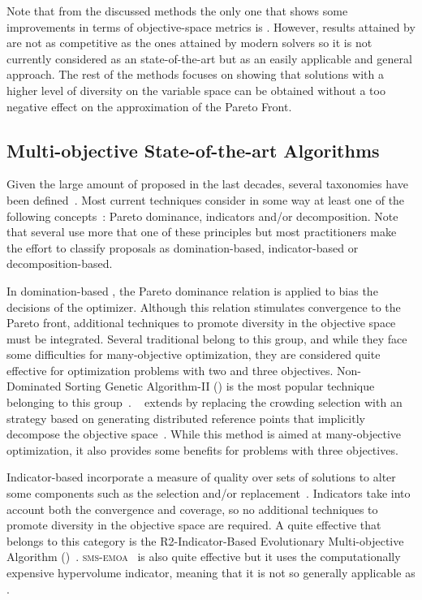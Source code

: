 Note that from the discussed methods the only one that shows some improvements in terms of objective-space metrics is \GDEA{}.
%
However, results attained by \GDEA{} are not as competitive as the ones attained by modern solvers so it is not currently
considered as an state-of-the-art \MOEA{} but as an easily applicable and general approach.
%
The rest of the methods focuses on showing that solutions with a higher level of diversity on the variable space
can be obtained without a too negative effect
on the approximation of the Pareto Front.


\subsection{Multi-objective State-of-the-art Algorithms}

Given the large amount of \MOEAS{} proposed in the last decades, several taxonomies have been defined~\cite{bechikh2016recent}.
%
Most current techniques consider in some way at least one of the following concepts~\cite{trivedi2016survey}:
Pareto dominance, indicators and/or decomposition.
%
Note that several \MOEAS{} use more that one of these principles but most practitioners make the effort to classify
proposals as domination-based, indicator-based or decomposition-based.

In domination-based \MOEAS{}, the Pareto dominance relation is applied to bias the decisions of the optimizer.
%
Although this relation stimulates convergence to the Pareto front, additional techniques to promote
diversity in the objective space must be integrated.
%
Several traditional \MOEAS{} belong to this group, and while they face some difficulties for many-objective
optimization, they are considered quite effective for optimization problems with two and three objectives.
%
Non-Dominated Sorting Genetic Algorithm-II (\NSGAII{}) is the most popular technique belonging to this group~\cite{deb2002fast}.
%
\NSGAIII{}~\cite{deb2013evolutionary} extends \NSGAII{} by replacing the crowding selection with an strategy 
based on generating distributed reference points that implicitly decompose the objective space~\cite{trivedi2016survey}.
%
While this method is aimed at many-objective optimization, it also provides some benefits for problems with three objectives.

Indicator-based \MOEAS{} incorporate a measure of quality over sets of solutions to alter some components such as the 
selection and/or replacement~\cite{beume2007sms}.
%
Indicators take into account both the convergence and coverage, so no additional techniques to promote diversity
in the objective space are required.
%
A quite effective \MOEA{} that belongs to this category is the R2-Indicator-Based Evolutionary Multi-objective 
Algorithm (\RMOEA{})~\cite{trautmann2013r2}.
%
\textsc{sms-emoa}~\cite{Joel:SMSEMOA} is also quite effective 
but it uses the computationally expensive hypervolume indicator, meaning that it is not so generally applicable as \RMOEA{}.


